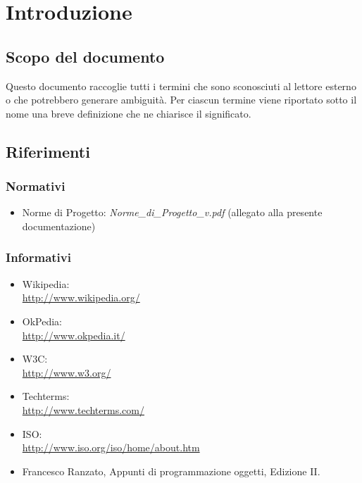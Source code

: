 \newpage
\section{Introduzione}%
\label{1.0}
\subsection{Scopo del documento}%
\label{1.1}
Questo documento raccoglie tutti i termini che sono sconosciuti al lettore esterno o che potrebbero generare ambiguità. Per ciascun termine viene riportato sotto il nome una breve definizione che ne chiarisce il significato.
\subsection{Riferimenti} %
\label{1.4}
\subsubsection{Normativi} %
\label{1.4.1}
\begin{itemize}
\item Norme di Progetto: \emph{Norme\_{}di\_{}Progetto\_{}v\versioneNormeDiProgetto{}.pdf}  (allegato alla presente documentazione)\\
\end{itemize}
\subsubsection{Informativi} %
\label{1.4.2}
\begin{itemize}
\item Wikipedia:\\ \url{ http://www.wikipedia.org/}
\item OkPedia:\\ \url{ http://www.okpedia.it/}
\item W3C:\\ \url{http://www.w3.org/}
\item Techterms:\\ \url{http://www.techterms.com/}
\item ISO:\\ \url{http://www.iso.org/iso/home/about.htm}
\item Francesco Ranzato, Appunti di programmazione oggetti, Edizione II.\\
\end{itemize}








